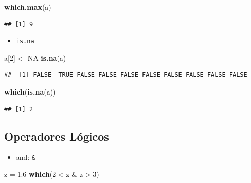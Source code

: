 \documentclass[]{article}
\def\tightlist{}
\newenvironment{Shaded}{\begin{snugshade}}{\end{snugshade}}
\newcommand{\KeywordTok}[1]{\textcolor[rgb]{0.13,0.29,0.53}{\textbf{{#1}}}}
\newcommand{\DecValTok}[1]{\textcolor[rgb]{0.00,0.00,0.81}{{#1}}}
\newcommand{\StringTok}[1]{\textcolor[rgb]{0.31,0.60,0.02}{{#1}}}
\newcommand{\OtherTok}[1]{\textcolor[rgb]{0.56,0.35,0.01}{{#1}}}
\newcommand{\NormalTok}[1]{{#1}}
\numberwithin{equation}{section}
\begin{document}
\begin{Shaded}
\begin{Highlighting}[]
\KeywordTok{which.max}\NormalTok{(a)}
\end{Highlighting}
\end{Shaded}

\begin{verbatim}
## [1] 9
\end{verbatim}

\begin{itemize}
\tightlist
\item
  \texttt{is.na}
\end{itemize}

\begin{Shaded}
\begin{Highlighting}[]
 \NormalTok{a[}\DecValTok{2}\NormalTok{] <-}\StringTok{ }\OtherTok{NA}
\KeywordTok{is.na}\NormalTok{(a)}
\end{Highlighting}
\end{Shaded}

\begin{verbatim}
##  [1] FALSE  TRUE FALSE FALSE FALSE FALSE FALSE FALSE FALSE FALSE
\end{verbatim}

\begin{Shaded}
\begin{Highlighting}[]
\KeywordTok{which}\NormalTok{(}\KeywordTok{is.na}\NormalTok{(a))}
\end{Highlighting}
\end{Shaded}

\begin{verbatim}
## [1] 2
\end{verbatim}

\subsection{Operadores Lógicos}\label{operadores-logicos}

\begin{itemize}
\tightlist
\item
  and: \texttt{\&}
\end{itemize}

\begin{Shaded}
\begin{Highlighting}[]
\NormalTok{z =}\StringTok{ }\DecValTok{1}\NormalTok{:}\DecValTok{6}
\KeywordTok{which}\NormalTok{(}\DecValTok{2} \NormalTok{<}\StringTok{ }\NormalTok{z &}\StringTok{ }\NormalTok{z >}\StringTok{ }\DecValTok{3}\NormalTok{)}
\end{Highlighting}
\end{Shaded}
\end{document}

